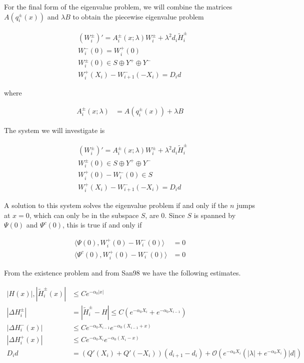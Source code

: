 \documentclass[12pt]{article}
\begin{document}
For the final form of the eigenvalue problem, we will combine the matrices $A( q_i^\pm(x) )$ and $\lambda B$ to obtain the piecewise eigenvalue problem

\begin{align*}
&(W_i^\pm)' = A_i^\pm(x; \lambda) W_i^\pm + \lambda^2 d_i \tilde{H}_i^\pm \\
&W_i^-(0) = W_i^+(0) \\
&W_i^\pm(0) \in S \oplus Y^+ \oplus Y^- \\
&W_i^+(X_i) - W_{i+1}^-(-X_i) = D_i d
\end{align*}

where

\begin{align*}
A_i^\pm(x; \lambda) &= A( q_i^\pm(x) ) + \lambda B 
\end{align*}

The system we will investigate is 

\begin{align*}
&(W_i^\pm)' = A_i^\pm(x; \lambda) W_i^\pm + \lambda^2 d_i \tilde{H}_i^\pm \\
&W_i^\pm(0) \in S \oplus Y^+ \oplus Y^- \\
&W_i^+(0) - W_i^-(0) \in S \\
&W_i^+(X_i) - W_{i+1}^-(-X_i) = D_i d
\end{align*}

A solution to this system solves the eigenvalue problem if and only if the $n$ jumps at $x = 0$, which can only be in the subspace $S$, are 0. Since $S$ is spanned by $\Psi(0)$ and $\Psi^c(0)$, this is true if and only if 

\begin{align*}
\langle \Psi(0), W_i^+(0) - W_i^-(0) \rangle &= 0 \\
\langle \Psi^c(0), W_i^+(0) - W_i^-(0) \rangle &= 0
\end{align*}

From the existence problem and from San98 we have the following estimates.

\begin{align*}
|H(x)|, |\tilde{H}_i^\pm(x)| &\leq C e^{-\alpha_0 |x|} \\
|\Delta H_i^\pm| &= |\tilde{H}_i^\pm - H| \leq C(e^{-\alpha_0 X_i} + e^{-\alpha_0 X_{i-1}} ) \\
|\Delta H_i^-(x)| &\leq C e^{-\alpha_0 X_{i-1}} e^{-\alpha_0(X_{i-1} + x) } \\
|\Delta H_i^+(x)| &\leq C e^{-\alpha_0 X_i} e^{-\alpha_0(X_i - x) } \\
D_i d &= ( Q'(X_i) + Q'(-X_i))(d_{i+1} - d_i ) + \mathcal{O} \left( e^{-\alpha_0 X_i} \left( |\lambda| +  e^{-\alpha_0 X_i}  \right) |d| \right) \\
\end{align*}
\end{document}
